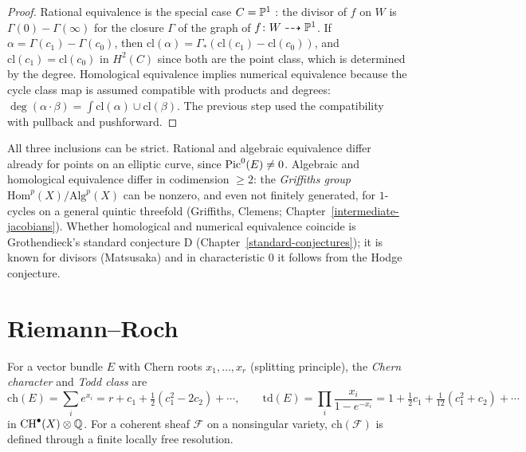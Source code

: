 \begin{proof}
Rational equivalence is the special case $C = \mathbb{P}^1$ \cite[Proposition 1.6]{fulton-intersection}: the divisor of $f$ on $W$ is $\Gamma(0) - \Gamma(\infty)$ for the closure $\Gamma$ of the graph
of $f \colon W \dashrightarrow \mathbb{P}^1$. If $\alpha = \Gamma(c_1) - \Gamma(c_0)$, then $\mathrm{cl}(\alpha) = \Gamma_*(\mathrm{cl}(c_1) - \mathrm{cl}(c_0))$, and
$\mathrm{cl}(c_1) = \mathrm{cl}(c_0)$ in $H^2(C)$ since both are the point class, which is determined by the degree. Homological equivalence implies numerical equivalence because the
cycle class map is assumed compatible with products and degrees: $\deg(\alpha \cdot \beta) = \int\mathrm{cl}(\alpha) \cup \mathrm{cl}(\beta)$. The previous step used the compatibility with pullback and pushforward.
\end{proof}

\begin{remark}\label{intersection-theory:remark-griffiths-group}
All three inclusions can be strict. Rational and algebraic equivalence differ already for points on an elliptic curve, since $\operatorname{Pic}^0(E) \neq 0$. Algebraic and homological equivalence
differ in codimension $\geq 2$: the \emph{Griffiths group} $\mathrm{Hom}^p(X)/\mathrm{Alg}^p(X)$ can be nonzero, and even not finitely generated, for $1$-cycles on a general quintic threefold
(Griffiths, Clemens; Chapter~\ref{intermediate-jacobians}). Whether homological and numerical equivalence coincide is Grothendieck's standard conjecture D
(Chapter~\ref{standard-conjectures}); it is known for divisors (Matsusaka) and in characteristic $0$ it follows from the Hodge conjecture.
\end{remark}

\section{Riemann--Roch}\label{intersection-theory:section-riemann-roch}

\begin{definition}\label{intersection-theory:definition-chern-character-todd}
For a vector bundle $E$ with Chern roots $x_1, \ldots, x_r$ (splitting principle), the \emph{Chern character} and \emph{Todd class} are
\[
\mathrm{ch}(E) = \sum_ie^{x_i} = r + c_1 + \tfrac12(c_1^2 - 2c_2) + \cdots, \qquad \mathrm{td}(E) = \prod_i\frac{x_i}{1 - e^{-x_i}} = 1 + \tfrac12c_1 + \tfrac{1}{12}(c_1^2 + c_2) + \cdots
\]
in $\operatorname{CH}^\bullet(X) \otimes \mathbb{Q}$. For a coherent sheaf $\mathcal{F}$ on a nonsingular variety, $\mathrm{ch}(\mathcal{F})$ is defined through a finite locally free resolution.
\end{definition}

